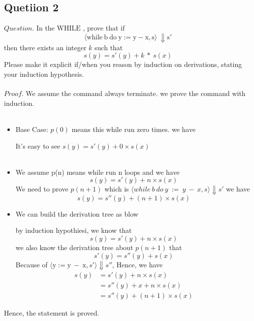 \documentclass[a4paper,11pt,fleqn]{article}
\theoremstyle{mytheor}
\begin{document}
\subsection*{Quetiion 2}
$Question.$ In the $\mathrm{WHILE}$ , prove that if\\
$$ \langle \mathrm{while\ b\ do\ y} := \mathrm{y} - \mathrm{x}, \mathrm{s} \rangle \ \Downarrow \mathrm{s'}$$
then there exists an integer $k$ such that\\
$$s(y) = s'(y) + k\ *\ s(x)$$
Please make it explicit if/when you reason by induction on derivations, stating your induction hypothesis.\\
\\
$Proof.$ We assume the command always terminate. we prove the command with induction.\\
\\
\begin{itemize}
\item Base Case: $p(0)$ means this while run zero times. we have
\begin{prooftree}
\end{prooftree}
It's easy to see $s(y) = s'(y) + 0 \times s(x)$\\
\\
\item We assume p(n) means while run n loops and we have
$$ s(y) = s'(y) + n \times s(x)$$
We need to prove $p(n + 1)$ which is $\langle while\ b\ do\ y\ :=\ y\ -\ x, s \rangle \Downarrow s'$ we have
$$ s(y) = s''(y) + (n + 1) \times s(x)$$
\item We can build the derivation tree as blow
\begin{prooftree}
\end{prooftree}
by induction hypothiesi, we know that\\
$$s(y) = s'(y) + n \times s(x)$$
we also know the derivation tree about $p(n + 1)$ that
$$s'(y) = s''(y) + s(x)$$
Because of $\langle \mathrm{y := y\ - \ x}, s' \rangle \Downarrow s''$, Hence, we have
\begin{equation}
\begin{split}
s(y) &= s'(y) + n \times s(x)\\
&= s''(y) + x + n\times s(x)\\
&= s''(y) + (n + 1) \times s(x)
\nonumber
\end{split}
\end{equation}
\end{itemize}
Hence, the statement is proved. 
\end{document}
